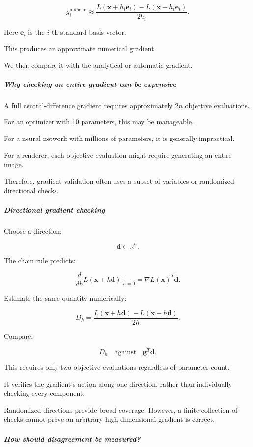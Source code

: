 \[
\boxed{ g_i^{\mathrm{numeric}} \approx \frac{ L(\mathbf x+h_i\mathbf e_i)- L(\mathbf x-h_i\mathbf e_i) }{2h_i} }.
\]

Here \(\mathbf e_i\) is the \(i\)-th standard basis vector.

This produces an approximate numerical gradient.

We then compare it with the analytical or automatic gradient.

\subparagraph{Why checking an entire gradient can be expensive}\label{why-checking-an-entire-gradient-can-be-expensive}

A full central-difference gradient requires approximately \(2n\) objective evaluations.

For an optimizer with 10 parameters, this may be manageable.

For a neural network with millions of parameters, it is generally impractical.

For a renderer, each objective evaluation might require generating an entire image.

Therefore, gradient validation often uses a subset of variables or randomized directional checks.

\subparagraph{Directional gradient checking}\label{directional-gradient-checking}

Choose a direction:

\[
\mathbf d\in\mathbb R^n.
\]

The chain rule predicts:

\[
\frac{d}{dh}L(\mathbf x+h\mathbf d)\bigg|_{h=0} = \nabla L(\mathbf x)^T\mathbf d.
\]

Estimate the same quantity numerically:

\[
\boxed{ D_h= \frac{ L(\mathbf x+h\mathbf d)- L(\mathbf x-h\mathbf d) }{2h} }.
\]

Compare:

\[
D_h \quad\text{against}\quad \mathbf g^T\mathbf d.
\]

This requires only two objective evaluations regardless of parameter count.

It verifies the gradient's action along one direction, rather than individually checking every component.

Randomized directions provide broad coverage. However, a finite collection of checks cannot prove an arbitrary high-dimensional gradient is correct.

\subparagraph{How should disagreement be measured?}\label{how-should-disagreement-be-measured}

